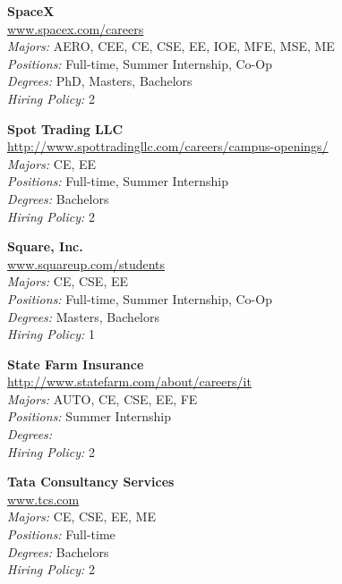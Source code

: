 \documentclass{article}
\begin{document}
\begin{center}
\begin{multicols}{3}
\begin{minipage}{.9\columnwidth}{\Large\bf SpaceX }\\
	\url{www.spacex.com/careers}\\
	\emph{Majors:} AERO, CEE, CE, CSE, EE, IOE, MFE, MSE, ME\\
	\emph{Positions:} Full-time, Summer Internship, Co-Op\\
	\emph{Degrees:} PhD, Masters, Bachelors\\
	\emph{Hiring Policy:} 2\\
\end{minipage}
 
\begin{minipage}{.9\columnwidth}{\Large\bf Spot Trading LLC }\\
	\url{http://www.spottradingllc.com/careers/campus-openings/}\\
	\emph{Majors:} CE, EE\\
	\emph{Positions:} Full-time, Summer Internship\\
	\emph{Degrees:} Bachelors\\
	\emph{Hiring Policy:} 2\\
\end{minipage}
 
\begin{minipage}{.9\columnwidth}{\Large\bf Square, Inc. }\\
	\url{www.squareup.com/students}\\
	\emph{Majors:} CE, CSE, EE\\
	\emph{Positions:} Full-time, Summer Internship, Co-Op\\
	\emph{Degrees:} Masters, Bachelors\\
	\emph{Hiring Policy:} 1\\
\end{minipage}
 
\begin{minipage}{.9\columnwidth}{\Large\bf State Farm Insurance }\\
	\url{http://www.statefarm.com/about/careers/it}\\
	\emph{Majors:} AUTO, CE, CSE, EE, FE\\
	\emph{Positions:} Summer Internship\\
	\emph{Degrees:} \\
	\emph{Hiring Policy:} 2\\
\end{minipage}
 
\begin{minipage}{.9\columnwidth}{\Large\bf Tata Consultancy Services }\\
	\url{www.tcs.com}\\
	\emph{Majors:} CE, CSE, EE, ME\\
	\emph{Positions:} Full-time\\
	\emph{Degrees:} Bachelors\\
	\emph{Hiring Policy:} 2\\
\end{minipage}
 

\end{multicols}
\end{center}
\end{document}
